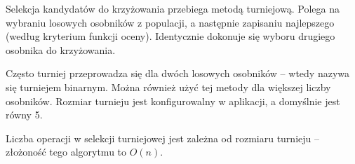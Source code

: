 Selekcja kandydatów do krzyżowania przebiega metodą turniejową\cite{turniej}. Polega na wybraniu losowych osobników z populacji, a następnie zapisaniu najlepszego (według kryterium funkcji oceny). Identycznie dokonuje się wyboru drugiego osobnika do krzyżowania.

Często turniej przeprowadza się dla dwóch losowych osobników -- wtedy nazywa się turniejem binarnym. Można również użyć tej metody dla większej liczby osobników. Rozmiar turnieju jest konfigurowalny w aplikacji, a domyślnie jest równy 5.

Liczba operacji w selekcji turniejowej jest zależna od rozmiaru turnieju -- złożoność tego algorytmu to $O(n)$.